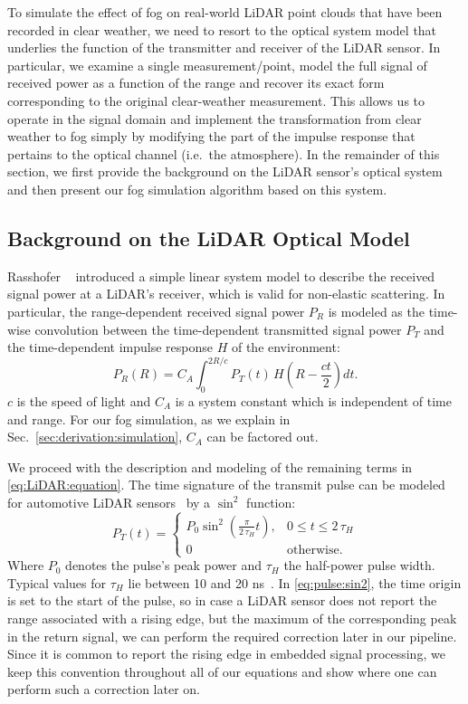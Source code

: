 \documentclass[10pt,twocolumn,letterpaper]{article}
\begin{document}
To simulate the effect of fog on real-world LiDAR point clouds that have been recorded in clear weather, we need to resort to the optical system model that underlies the function of the transmitter and receiver of the LiDAR sensor. In particular, we examine a single measurement/point, model the full signal of received power as a function of the range and recover its exact form corresponding to the original clear-weather measurement. This allows us to operate in the signal domain and implement the transformation from clear weather to fog simply by modifying the part of the impulse response that pertains to the optical channel (i.e.\ the atmosphere). In the remainder of this section, we first provide the background on the LiDAR sensor's optical system and then present our fog simulation algorithm based on this system. 

\subsection{Background on the LiDAR Optical Model}
\label{sec:derivation:background}

Rasshofer \etal~\cite{Rasshofer_2011} introduced a simple linear system model to describe the received signal power at a LiDAR's receiver, which is valid for non-elastic scattering. In particular, the range-dependent received signal power $P_R$ is modeled as the time-wise convolution between the time-dependent transmitted signal power $P_T$ and the time-dependent impulse response $H$ of the environment:
\begin{equation} \label{eq:LiDAR:equation}
    P_R(R) = C_A \int_0^{2R/c} P_T(t)\,H\left(R-\frac{ct}{2}\right) dt.
\end{equation}
$c$ is the speed of light and $C_A$ is a system constant which is independent of time and range. For our fog simulation, as we explain in Sec.~\ref{sec:derivation:simulation}, $C_A$ can be factored out.

We proceed with the description and modeling of the remaining terms in \eqref{eq:LiDAR:equation}. The time signature of the transmit pulse can be modeled for automotive LiDAR sensors~\cite{Rasshofer_2011} by a $\sin^2$ function:
\begin{equation} \label{eq:pulse:sin2}
    P_T(t) = \left\{
    \begin{array}{rl}
        P_0\sin^2\left(\frac{\pi}{2\,\tau_H}t\right), & 0 \leq t \leq 2\,\tau_H \\
        0 & \text{otherwise}.
    \end{array}
    \right.
\end{equation}
Where $P_0$ denotes the pulse's peak power and $\tau_H$ the half-power pulse width. Typical values for $\tau_H$ lie between 10 and 20 ns~\cite{Rasshofer_2011}. In \eqref{eq:pulse:sin2}, the time origin is set to the start of the pulse, so in case a LiDAR sensor does not report the range associated with a rising edge, but the maximum of the corresponding peak in the return signal, we can perform the required correction later in our pipeline. Since it is common to report the rising edge in embedded signal processing, we keep this convention throughout all of our equations and show where one can perform such a correction later on. 
\end{document}
